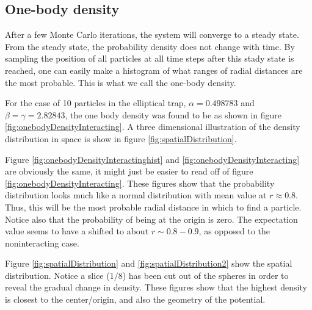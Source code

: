 \documentclass[english, a4paper]{article}
\begin{document}
\subsection{One-body density}
After a few Monte Carlo iterations, the system will converge to a steady state.
From the steady state, the probability density does not change with time. 
By sampling the position of all particles at all time steps after this stady state is 
reached, one can easily make a histogram of what ranges of radial distances are the most probable.
This is what we call the one-body density. 

For the case of 10 particles in the elliptical trap, $\alpha = 0.498783$ and $\beta = \gamma = 2.82843$, the one body density was found to be as shown in figure \ref{fig:onebodyDensityInteracting}.
A three dimensional illustration of the density distribution in space is show in figure \ref{fig:spatialDistribution}. 

Figure \ref{fig:onebodyDensityInteractinghist} and \ref{fig:onebodyDensityInteracting} are obviously the same, it might just be easier to read off of figure \ref{fig:onebodyDensityInteracting}. These figures show that the probability distribution looks much like a normal distribution with mean value at $r\approx0.8$. Thus, this will be the most probable radial distance in which to find a particle. Notice also that the probability of being at the origin is zero.
The expectation value seems to have a shifted to about $r\sim 0.8-0.9$, as opposed to the noninteracting case.

Figure \ref{fig:spatialDistribution} and \ref{fig:spatialDistribution2} show the spatial distribution. Notice a slice ($1/8$) has been cut out of the spheres in order to reveal the gradual change in density. These figures show that the highest density is closest to the center/origin, and also the geometry of the potential. 
\end{document}
